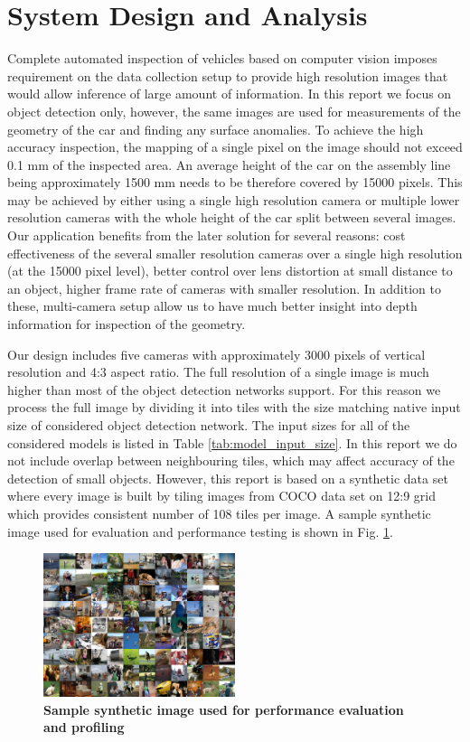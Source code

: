\documentclass[conference]{IEEEtran}
\begin{document}
\section{System Design and Analysis}
Complete automated inspection of vehicles based on computer vision imposes requirement on the data collection setup to provide high resolution images that would allow inference of large amount of information. In this report we focus on object detection only, however, the same images are used for measurements of the geometry of the car and finding any surface anomalies. To achieve the high accuracy inspection, the mapping of a single pixel on the image should not exceed 0.1 mm of the inspected area. An average height of the car on the assembly line being approximately 1500 mm needs to be therefore covered by 15000 pixels. This may be achieved by either using a single high resolution camera or multiple lower resolution cameras with the whole height of the car split between several images. Our application benefits from the later solution for several reasons: cost effectiveness of the several smaller resolution cameras over a single high resolution (at the 15000 pixel level), better control over lens distortion at small distance to an object, higher frame rate of cameras with smaller resolution. In addition to these, multi-camera setup allow us to have much better insight into depth information for inspection of the geometry. 

Our design includes five cameras with approximately 3000 pixels of vertical resolution and 4:3 aspect ratio. The full resolution of a single image is much higher than most of the object detection networks support. For this reason we process the full image by dividing it into tiles with the size matching native input size of considered object detection network. The input sizes for all of the considered models is listed in Table \ref{tab:model_input_size}. In this report we do not include overlap between neighbouring tiles, which may affect accuracy of the detection of small objects. However, this report is based on a synthetic data set where every image is built by tiling images from COCO data set on 12:9 grid which provides consistent number of 108 tiles per image. A sample synthetic image used for evaluation and performance testing is shown in Fig. \ref{fig:sample_image}.

\begin{figure}[htpb]
	  \centering
	  \includegraphics[width=0.5\textwidth]{sample_image}
	  \caption{\textbf{Sample synthetic image used for  performance evaluation and profiling}}
	  \label{fig:sample_image}
\end{figure}
\end{document}

